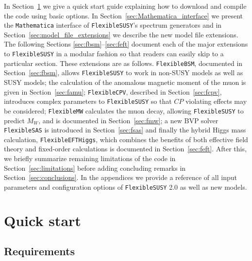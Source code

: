 \documentclass[final,3p,11pt,pdflatex]{elsarticle}
\makeatletter
\newcommand{\fs}{\texttt{FlexibleSUSY}\@\xspace}
\newcommand{\fstwo}{\fs 2.0\@\xspace}
\newcommand{\fbsm}{\texttt{FlexibleBSM}\@\xspace}
\newcommand{\fcpv}{\texttt{FlexibleCPV}\@\xspace}
\newcommand{\fmw}{\texttt{FlexibleMW}\@\xspace}
\newcommand{\fsas}{\texttt{FlexibleSAS}\@\xspace}
\newcommand{\feft}{\texttt{Flex\-ib\-le\-EFT\-Higgs}\@\xspace}
\newcommand{\mathematica}{\texttt{Ma\-the\-ma\-ti\-ca}\xspace}
\newcommand{\secref}[1]{Section~\ref{#1}}
\newcommand{\CP}{\ensuremath{CP}\xspace}
\makeatother
\begin{document}
In \secref{sec:download} we give a quick start guide explaining how to
download and compile the code using basic options.  In
\secref{sec:Mathematica_interface} we present the \mathematica
interface of \fs's spectrum generators and in
\secref{sec:model_file_extensions} we describe the new model file
extensions.  The
following Sections \ref{sec:fbsm}--\ref{sec:feft} document
each of the major extensions to \fs in a
modular fashion so that readers
can easily skip to a particular section.  These extensions are
as follows.  \fbsm, documented in \secref{sec:fbsm}, allows \fs to work in
non-SUSY models as well as SUSY models; the calculation of the
anomalous magnetic moment of the muon is
given in \secref{sec:famu}; \fcpv, described in
\secref{sec:fcpv}, introduces complex parameters to \fs so that \CP
violating effects may be considered; \fmw calculates the
muon decay, allowing \fs to predict $M_W$, and
is documented in \secref{sec:fmw}; a new BVP solver \fsas is
introduced in \secref{sec:fsas} and finally the hybrid Higgs mass
calculation, \feft, which combines the benefits of both effective field theory
and fixed-order calculations is documented in \secref{sec:feft}.
After this, we briefly summarize remaining limitations of the code in
\secref{sec:limitations} before adding concluding remarks in
\secref{sec:conclusions}.
%
In the appendices we provide a reference of all input parameters and
configuration options of \fstwo as well as new models.

\section{Quick start}
\label{sec:download}

\subsection{Requirements}
\end{document}

